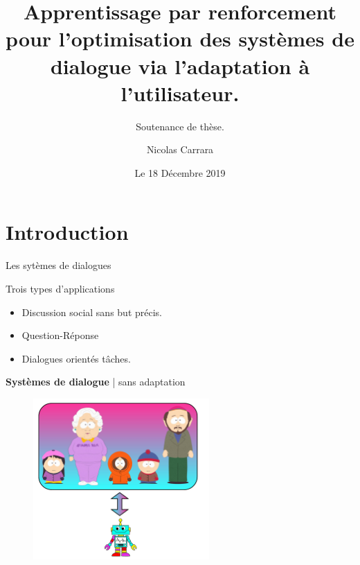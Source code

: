 \documentclass[french]{beamer}
\title[TITLE]{Apprentissage par renforcement pour l'optimisation des systèmes de dialogue via l'adaptation à l'utilisateur.}
\subtitle{Soutenance de thèse.}
\author{Nicolas Carrara}
\institute[ULille]{Université de Lille}
\date{Le 18 Décembre 2019}
\begin{document}
    \begin{frame}
        \maketitle
        \centering
    \end{frame}

    \section{Introduction}

    \begin{frame}{Les sytèmes de dialogues}


    \end{frame}

    \begin{frame}{Trois types d'applications}

        \begin{itemize}
            \item Discussion social sans but précis.
            \item Question-Réponse
            \item Dialogues orientés tâches.
        \end{itemize}


    \end{frame}

    \begin{frame}{\textbf{Systèmes de dialogue} | sans adaptation}
        \begin{figure}
            \begin{center}
                \includegraphics[width=0.6\textwidth]{img/adap0.pdf}
            \end{center}
        \end{figure}
    \end{frame}
\end{document}
